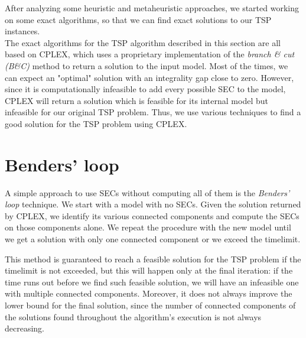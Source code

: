 After analyzing some heuristic and metaheuristic approaches, we started working on some exact algorithms, so that we can find exact solutions to our TSP instances.\\

The exact algorithms for the TSP algorithm described in this section are all based on CPLEX, which uses a proprietary implementation of the \textit{branch \& cut (B\&C)} method to return a solution to the input model. Most of the times, we can expect an "optimal" solution with an integrality gap close to zero. However, since it is computationally infeasible to add every possible SEC to the model, CPLEX will return a solution which is feasible for its internal model but infeasible for our original TSP problem. Thus, we use various techniques to find a good solution for the TSP problem using CPLEX.

\section{Benders' loop}
A simple approach to use SECs without computing all of them is the \textit{Benders' loop} technique. We start with a model with no SECs. Given the solution returned by CPLEX, we identify its various connected components and compute the SECs on those components alone. We repeat the procedure with the new model until we get a solution with only one connected component or we exceed the timelimit.

This method is guaranteed to reach a feasible solution for the TSP problem if the timelimit is not exceeded, but this will happen only at the final iteration: if the time runs out before we find such feasible solution, we will have an infeasible one with multiple connected components. Moreover, it does not always improve the lower bound for the final solution, since the number of connected components of the solutions found throughout the algorithm's execution is not always decreasing.
\newpage
\FloatBarrier
